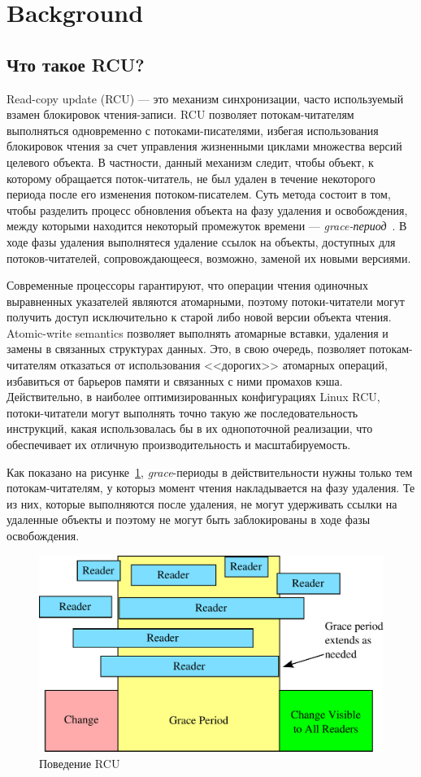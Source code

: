 \section{Background}

\subsection{Что такое RCU?}

Read-copy update (RCU) --- это механизм синхронизации,
часто используемый взамен блокировок чтения-записи.
RCU позволяет потокам-читателям выполняться одновременно
с потоками-писателями, избегая использования блокировок
чтения за счет управления жизненными циклами
множества версий целевого объекта.
В частности, данный механизм следит, чтобы объект,
к которому обращается поток-читатель,
не был удален в течение некоторого периода
после его изменения потоком-писателем.
Суть метода состоит в том, чтобы разделить процесс обновления
объекта на фазу удаления и освобождения, между которыми находится
некоторый промежуток времени --- \emph{grace-период}~\cite{McKenneyRCU98}.
В ходе фазы удаления выполнятеся удаление ссылок на объекты,
доступных для потоков-читателей, сопровождающееся, возможно,
заменой их новыми версиями.

Современные процессоры гарантируют, что операции чтения
одиночных выравненных указателей являются атомарными,
поэтому потоки-читатели могут получить доступ исключительно
к старой либо новой версии объекта чтения.
Atomic-write semantics позволяет выполнять атомарные вставки,
удаления и замены в связанных структурах данных.
Это, в свою очередь, позволяет потокам-читателям отказаться
от использования <<дорогих>> атомарных операций,
избавиться от барьеров памяти и связанных с ними промахов кэша.
Действительно, в наиболее оптимизированных конфигурациях Linux RCU,
потоки-читатели могут выполнять точно такую же последовательность
инструкций, какая использовалась бы в их однопоточной реализации,
что обеспечивает их отличную производительность и масштабируемость.

Как показано на рисунке~\ref{fig:rcu_concepts}, \emph{grace}-периоды
в действительности нужны только тем потокам-читателям,
у которыз момент чтения накладывается на фазу удаления.
Те из них, которые выполняются после удаления, не могут удерживать ссылки
на удаленные объекты и поэтому не могут быть заблокированы
в ходе фазы освобождения.

\begin{figure}[tbp]
\centering
\includegraphics[scale=0.35]{rcu_concepts.pdf}
\caption{Поведение RCU}
\label{fig:rcu_concepts}
\end{figure}


